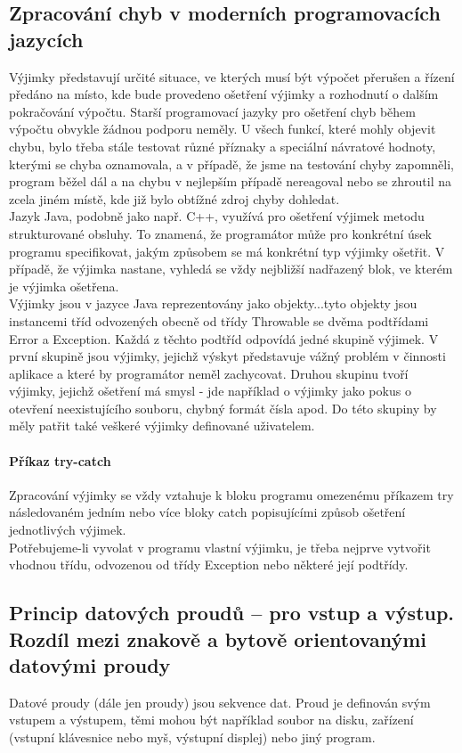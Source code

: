 \documentclass[10pt,a4paper]{article}
\begin{document}
\subsection{Zpracování chyb v moderních programovacích jazycích}
Výjimky představují určité situace, ve kterých musí být výpočet přerušen a řízení předáno na místo, kde bude provedeno ošetření výjimky a rozhodnutí o dalším pokračování výpočtu. Starší programovací jazyky pro ošetření chyb během výpočtu obvykle žádnou podporu neměly. U všech funkcí, které mohly objevit chybu, bylo třeba stále testovat různé příznaky a speciální návratové hodnoty, kterými se chyba oznamovala, a v případě, že jsme na testování chyby zapomněli, program běžel dál a na chybu v nejlepším případě nereagoval nebo se zhroutil na zcela jiném místě, kde již bylo obtížné zdroj chyby dohledat. \\

Jazyk Java, podobně jako např. C++, využívá pro ošetření výjimek metodu strukturované obsluhy. To znamená, že programátor může pro konkrétní úsek programu specifikovat, jakým způsobem se má konkrétní typ výjimky ošetřit. V případě, že výjimka nastane, vyhledá se vždy nejbližší nadřazený blok, ve kterém je výjimka ošetřena. \\

Výjimky jsou v jazyce Java reprezentovány jako objekty...tyto objekty jsou instancemi tříd odvozených obecně od třídy Throwable se dvěma podtřídami Error a Exception. Každá z těchto podtříd odpovídá jedné skupině výjimek. V první skupině jsou výjimky, jejichž výskyt představuje vážný problém v činnosti aplikace a které by programátor neměl zachycovat. Druhou skupinu tvoří výjimky, jejichž ošetření má smysl - jde například o výjimky jako pokus o otevření neexistujícího souboru, chybný formát čísla apod. Do této skupiny by měly patřit také veškeré výjimky definované uživatelem.

\paragraph{Příkaz try-catch}
Zpracování výjimky se vždy vztahuje k bloku programu omezenému příkazem try následovaném jedním nebo více bloky catch popisujícími způsob ošetření jednotlivých výjimek. \\
Potřebujeme-li vyvolat v programu vlastní výjimku, je třeba nejprve vytvořit vhodnou třídu, odvozenou od třídy Exception nebo některé její podtřídy.

\subsection{Princip datových proudů – pro vstup a výstup. Rozdíl mezi znakově a bytově orientovanými datovými proudy}
Datové proudy (dále jen proudy) jsou sekvence dat. Proud je definován svým vstupem a výstupem, těmi mohou být například soubor na disku, zařízení (vstupní klávesnice nebo myš, výstupní displej) nebo jiný program.
\end{document}
